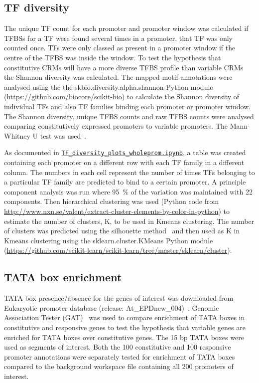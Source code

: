 \subsection{TF diversity}
{\label{chapter1:methods:tf-diversity}}

The unique TF count for each promoter and promoter window was calculated \ie{} if TFBSs for a TF were found several times in a promoter, that TF was only counted once.
TFs were only classed as present in a promoter window if the centre of the TFBS was inside the window.
To test the hypothesis that constitutive CRMs will have a more diverse TFBS profile than variable CRMs the Shannon diversity was calculated.
The mapped motif annotations were analysed using the the skbio.diversity.alpha.shannon Python module (\url{https://github.com/biocore/scikit-bio}) to calculate the Shannon diversity of individual TFs and also TF families binding each promoter or promoter window.
The Shannon diversity, unique TFBS counts and raw TFBS counts were analysed comparing constitutively expressed promoters to variable promoters.
The Mann\hyp{}Whitney U test was used~\autocite{mannTestWhetherOne1947}.

As documented in \href{https://github.com/Switham1/PromoterArchitecture/blob/master/src/plotting/TF_diversity_plots_wholeprom.ipynb}{\texttt{TF\_diversity\_plots\_wholeprom.ipynb}}, a table was created containing each promoter on a different row with each TF family in a different column.
The numbers in each cell represent the number of times TFs belonging to a particular TF family are predicted to bind to a certain promoter.
A principle component analysis was run where \SI{95}{\percent} of the variation was maintained with 22 components.
Then hierarchical clustering was used (Python code from \url{http://www.nxn.se/valent/extract-cluster-elements-by-color-in-python}) to estimate the number of clusters, K, to be used in Kmeans clustering.
The number of clusters was predicted using the silhouette method~\autocite{rousseeuwSilhouettesGraphicalAid1987} and then used as K in Kmeans clustering using the sklearn.cluster.KMeans Python module (\url{https://github.com/scikit-learn/scikit-learn/tree/master/sklearn/cluster}).

\subsection{TATA box enrichment}
\label{chapter1:methods:tata-box-enrichment}

TATA box presence/absence for the genes of interest was downloaded from Eukaryotic promoter database (release: At\_EPDnew\_004)~\autocite{dreosEukaryoticPromoterDatabase2017}.
Genomic Association Tester (GAT)~\autocite{hegerGATSimulationFramework2013} was used to
compare enrichment of TATA boxes in constitutive and responsive genes to test the hypothesis that variable genes are enriched for TATA boxes over constitutive genes.
The 15 bp TATA boxes were used as segments of interest. Both the 100 constitutive and 100 responsive promoter annotations were separately tested for enrichment of TATA boxes compared to the background workspace file containing all 200 promoters of interest.

